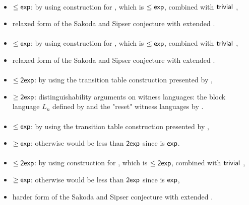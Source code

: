 \paragraph{\ONFA{}\tto\ODLA}
\begin{itemize}
	\item $\le\mathsf{exp}$: by using construction for \hyperref[cost:1NFAto1DFA]{\ONFA{}\tto\ODFA}, which is $\le\mathsf{exp}$, combined with $\mathsf{trivial}$ \ODFA{}\tto\ODLA,
	\item relaxed form of the Sakoda and Sipser conjecture with extended \TDFA.
\end{itemize}
\paragraph{\TNFA{}\tto\ODLA}
\begin{itemize}
	\item $\le\mathsf{exp}$: by using construction for \hyperref[cost:2NFAto1DFA]{\TNFA{}\tto\ODFA}, which is $\le\mathsf{exp}$, combined with $\mathsf{trivial}$ \ODFA{}\tto\ODLA,
	\item relaxed form of the Sakoda and Sipser conjecture with extended \TDFA.
\end{itemize}
\paragraph{\OLA{}\tto\ODFA}\label{cost:1LAto1DFA}
\begin{itemize}
	\item $\le\mathsf{2exp}$: by using the transition table construction presented by ,
	\item $\ge\mathsf{2exp}$: distinguishability arguments on witness languages: the block language $L_n$ defined by  and the "reset" witness languages by .
\end{itemize}
\paragraph{\OLA{}\tto\ONFA}\label{cost:1LAto1NFA}
\begin{itemize}
	\item $\le\mathsf{exp}$: by using the transition table construction presented by ,
	\item $\ge\mathsf{exp}$: otherwise \hyperref[cost:1LAto1DFA]{\OLA{}\tto\ODFA} would be less than $\mathsf{2exp}$ since \hyperref[cost:1NFAto1DFA]{\ONFA{}\tto\ODFA} is $\mathsf{exp}$.
\end{itemize}
\paragraph{\OLA{}\tto\TDFA}
\begin{itemize}
	\item $\le\mathsf{2exp}$: by using construction for \hyperref[cost:1LAto1DFA]{\OLA{}\tto\ODFA}, which is $\le\mathsf{2exp}$, combined with $\mathsf{trivial}$ \ODFA{}\tto\TDFA,
	\item $\ge\mathsf{exp}$: otherwise \hyperref[cost:1LAto1DFA]{\OLA{}\tto\ODFA} would be less than $\mathsf{2exp}$ since \hyperref[cost:2DFAto1DFA]{\TDFA{}\tto\ODFA} is $\mathsf{exp}$,
	\item harder form of the Sakoda and Sipser conjecture with extended \TNFA.
\end{itemize}
